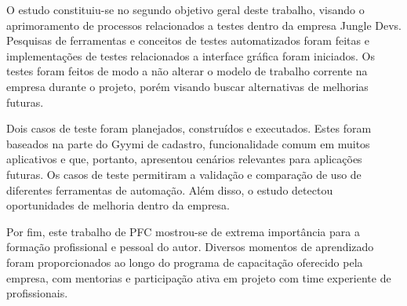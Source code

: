 O estudo constituiu-se no segundo objetivo geral deste trabalho, visando o aprimoramento de processos relacionados a testes dentro da empresa Jungle Devs. Pesquisas de ferramentas e conceitos de testes automatizados foram feitas e implementações de testes relacionados a interface gráfica foram iniciados. Os testes foram feitos de modo a não alterar o modelo de trabalho corrente na empresa durante o projeto, porém visando buscar alternativas de melhorias futuras.

Dois casos de teste foram planejados, construídos e executados. Estes foram baseados na parte do Gyymi de cadastro, funcionalidade comum em muitos aplicativos e que, portanto, apresentou cenários relevantes para aplicações futuras. Os casos de teste permitiram a validação e comparação de uso de diferentes ferramentas de automação. Além disso, o estudo detectou oportunidades de melhoria dentro da empresa.

Por fim, este trabalho de PFC mostrou-se de extrema importância para a formação profissional e pessoal do autor. Diversos momentos de aprendizado foram proporcionados ao longo do programa de capacitação oferecido pela empresa, com mentorias e participação ativa em projeto com time experiente de profissionais.
